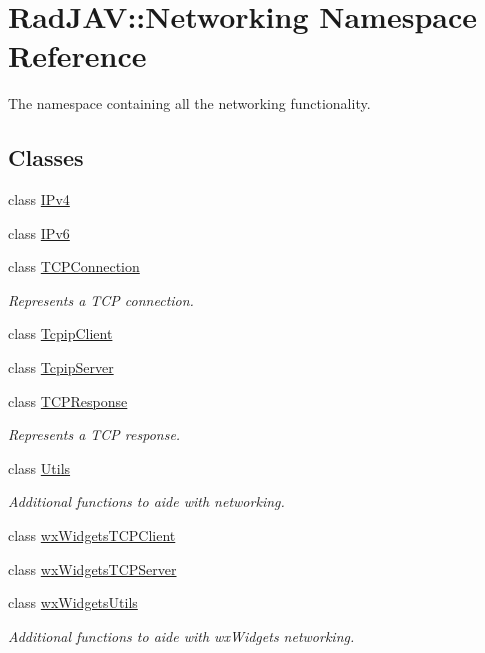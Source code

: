 \hypertarget{namespace_rad_j_a_v_1_1_networking}{}\section{Rad\+J\+AV\+:\+:Networking Namespace Reference}
\label{namespace_rad_j_a_v_1_1_networking}


The namespace containing all the networking functionality.  


\subsection*{Classes}
\begin{DoxyCompactItemize}
\item 
class \mbox{\hyperlink{class_rad_j_a_v_1_1_networking_1_1_i_pv4}{I\+Pv4}}
\item 
class \mbox{\hyperlink{class_rad_j_a_v_1_1_networking_1_1_i_pv6}{I\+Pv6}}
\item 
class \mbox{\hyperlink{class_rad_j_a_v_1_1_networking_1_1_t_c_p_connection}{T\+C\+P\+Connection}}
\begin{DoxyCompactList}\small\item\em Represents a T\+CP connection. \end{DoxyCompactList}\item 
class \mbox{\hyperlink{class_rad_j_a_v_1_1_networking_1_1_tcpip_client}{Tcpip\+Client}}
\item 
class \mbox{\hyperlink{class_rad_j_a_v_1_1_networking_1_1_tcpip_server}{Tcpip\+Server}}
\item 
class \mbox{\hyperlink{class_rad_j_a_v_1_1_networking_1_1_t_c_p_response}{T\+C\+P\+Response}}
\begin{DoxyCompactList}\small\item\em Represents a T\+CP response. \end{DoxyCompactList}\item 
class \mbox{\hyperlink{class_rad_j_a_v_1_1_networking_1_1_utils}{Utils}}
\begin{DoxyCompactList}\small\item\em Additional functions to aide with networking. \end{DoxyCompactList}\item 
class \mbox{\hyperlink{class_rad_j_a_v_1_1_networking_1_1wx_widgets_t_c_p_client}{wx\+Widgets\+T\+C\+P\+Client}}
\item 
class \mbox{\hyperlink{class_rad_j_a_v_1_1_networking_1_1wx_widgets_t_c_p_server}{wx\+Widgets\+T\+C\+P\+Server}}
\item 
class \mbox{\hyperlink{class_rad_j_a_v_1_1_networking_1_1wx_widgets_utils}{wx\+Widgets\+Utils}}
\begin{DoxyCompactList}\small\item\em Additional functions to aide with wx\+Widgets networking. \end{DoxyCompactList}\end{DoxyCompactItemize}
